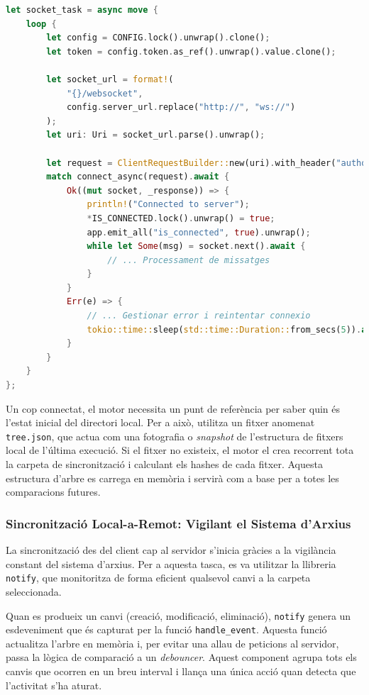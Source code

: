 \begin{lstlisting}[language=Rust, caption={Establiment de la connexió WebSocket a \texttt{synchronizer.rs}}]
let socket_task = async move {
    loop {
        let config = CONFIG.lock().unwrap().clone();
        let token = config.token.as_ref().unwrap().value.clone();

        let socket_url = format!(
            "{}/websocket",
            config.server_url.replace("http://", "ws://")
        );
        let uri: Uri = socket_url.parse().unwrap();

        let request = ClientRequestBuilder::new(uri).with_header("authorization", &token);
        match connect_async(request).await {
            Ok((mut socket, _response)) => {
                println!("Connected to server");
                *IS_CONNECTED.lock().unwrap() = true;
                app.emit_all("is_connected", true).unwrap();
                while let Some(msg) = socket.next().await {
                    // ... Processament de missatges
                }
            }
            Err(e) => {
                // ... Gestionar error i reintentar connexio
                tokio::time::sleep(std::time::Duration::from_secs(5)).await;
            }
        }
    }
};
\end{lstlisting}

Un cop connectat, el motor necessita un punt de referència per saber quin és l'estat inicial del directori local. Per a això, utilitza un fitxer anomenat \texttt{tree.json}, que actua com una fotografia o \textit{snapshot} de l'estructura de fitxers local de l'última execució. Si el fitxer no existeix, el motor el crea recorrent tota la carpeta de sincronització i calculant els hashes de cada fitxer. Aquesta estructura d'arbre es carrega en memòria i servirà com a base per a totes les comparacions futures.

\subsubsection{Sincronització Local-a-Remot: Vigilant el Sistema d'Arxius}
La sincronització des del client cap al servidor s'inicia gràcies a la vigilància constant del sistema d'arxius. Per a aquesta tasca, es va utilitzar la llibreria \texttt{notify}, que monitoritza de forma eficient qualsevol canvi a la carpeta seleccionada.

Quan es produeix un canvi (creació, modificació, eliminació), \texttt{notify} genera un esdeveniment que és capturat per la funció \texttt{handle\_event}. Aquesta funció actualitza l'arbre en memòria i, per evitar una allau de peticions al servidor, passa la lògica de comparació a un \textit{debouncer}. Aquest component agrupa tots els canvis que ocorren en un breu interval i llança una única acció quan detecta que l'activitat s'ha aturat.

